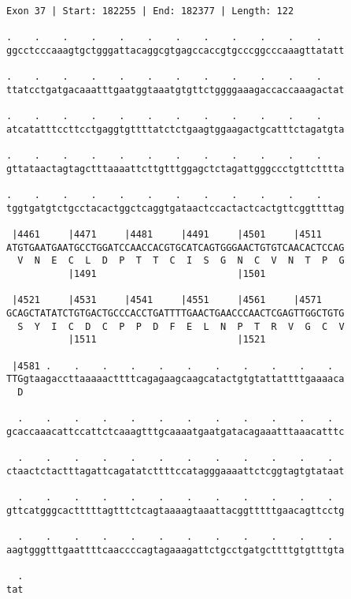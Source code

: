 \documentclass{article}
\begin{document}
\begin{Verbatim}
Exon 37 | Start: 182255 | End: 182377 | Length: 122
 
.    .    .    .    .    .    .    .    .    .    .    .    
ggcctcccaaagtgctgggattacaggcgtgagccaccgtgcccggcccaaagttatatt
  
.    .    .    .    .    .    .    .    .    .    .    .    
ttatcctgatgacaaatttgaatggtaaatgtgttctggggaaagaccaccaaagactat
  
.    .    .    .    .    .    .    .    .    .    .    .    
atcatatttccttcctgaggtgttttatctctgaagtggaagactgcatttctagatgta
  
.    .    .    .    .    .    .    .    .    .    .    .    
gttataactagtagctttaaaattcttgtttggagctctagattgggccctgttctttta
  
.    .    .    .    .    .    .    .    .    .    .    .    
tggtgatgtctgcctacactggctcaggtgataactccactactcactgttcggttttag
  
 |4461     |4471     |4481     |4491     |4501     |4511    
ATGTGAATGAATGCCTGGATCCAACCACGTGCATCAGTGGGAACTGTGTCAACACTCCAG
  V  N  E  C  L  D  P  T  T  C  I  S  G  N  C  V  N  T  P  G
           |1491                         |1501              
  
 |4521     |4531     |4541     |4551     |4561     |4571    
GCAGCTATATCTGTGACTGCCCACCTGATTTTGAACTGAACCCAACTCGAGTTGGCTGTG
  S  Y  I  C  D  C  P  P  D  F  E  L  N  P  T  R  V  G  C  V
           |1511                         |1521              
  
 |4581 .    .    .    .    .    .    .    .    .    .    .  
TTGgtaagaccttaaaaacttttcagagaagcaagcatactgtgtattattttgaaaaca
  D                                                         
  
  .    .    .    .    .    .    .    .    .    .    .    .  
gcaccaaacattccattctcaaagtttgcaaaatgaatgatacagaaatttaaacatttc
  
  .    .    .    .    .    .    .    .    .    .    .    .  
ctaactctactttagattcagatatcttttccatagggaaaattctcggtagtgtataat
  
  .    .    .    .    .    .    .    .    .    .    .    .  
gttcatgggcactttttagtttctcagtaaaagtaaattacggtttttgaacagttcctg
  
  .    .    .    .    .    .    .    .    .    .    .    .  
aagtgggtttgaattttcaaccccagtagaaagattctgcctgatgcttttgtgtttgta
  
  .
tat
\end{Verbatim}
\newpage
\end{document}
